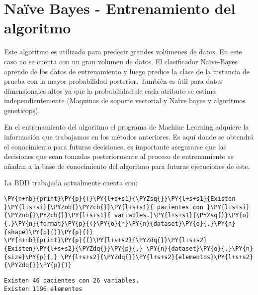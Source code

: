     \hypertarget{nauxefve-bayes---entrenamiento-del-algoritmo}{%
\section{Naïve Bayes - Entrenamiento del
algoritmo}\label{nauxefve-bayes---entrenamiento-del-algoritmo}}

Este algoritmo es utilizado para predecir grandes volúmenes de datos. En
este caso no se cuenta con un gran volumen de datos. El clasificador
Naïve-Bayes aprende de los datos de entrenamiento y luego predice la
clase de la instancia de prueba con la mayor probabilidad posterior.
También es útil para datos dimensionales altos ya que la probabilidad de
cada atributo se estima independientemente (Maquinas de soporte
vectorial y Naïve bayes y algoritmos geneticops).

En el entrenamiento del algoritmo el programa de Machine Learning
adquiere la información que trabajamos en los métodos anteriores. Es
aquí donde se obtendrá el conocimiento para futuras decisiones, es
importante asegurarse que las decisiones que sean tomadas posteriormente
al proceso de entrenamiento se añadan a la base de conocimiento del
algoritmo para futuras ejecuciones de este.

La BDD trabajada actualmente cuenta con:

    \begin{tcolorbox}[breakable, size=fbox, boxrule=1pt, pad at break*=1mm,colback=cellbackground, colframe=cellborder]
\begin{Verbatim}[commandchars=\\\{\}]
\PY{n+nb}{print}\PY{p}{(}\PY{l+s+s1}{\PYZsq{}}\PY{l+s+s1}{Existen }\PY{l+s+si}{\PYZob{}\PYZcb{}}\PY{l+s+s1}{ pacientes con }\PY{l+s+si}{\PYZob{}\PYZcb{}}\PY{l+s+s1}{ variables.}\PY{l+s+s1}{\PYZsq{}}\PY{o}{.}\PY{n}{format}\PY{p}{(}\PY{o}{*}\PY{n}{dataset}\PY{o}{.}\PY{n}{shape}\PY{p}{)}\PY{p}{)}
\PY{n+nb}{print}\PY{p}{(}\PY{l+s+s2}{\PYZdq{}}\PY{l+s+s2}{Existen}\PY{l+s+s2}{\PYZdq{}}\PY{p}{,} \PY{n}{dataset}\PY{o}{.}\PY{n}{size}\PY{p}{,} \PY{l+s+s2}{\PYZdq{}}\PY{l+s+s2}{elementos}\PY{l+s+s2}{\PYZdq{}}\PY{p}{)}
\end{Verbatim}
\end{tcolorbox}

    \begin{Verbatim}[commandchars=\\\{\}]
Existen 46 pacientes con 26 variables.
Existen 1196 elementos
    \end{Verbatim}

